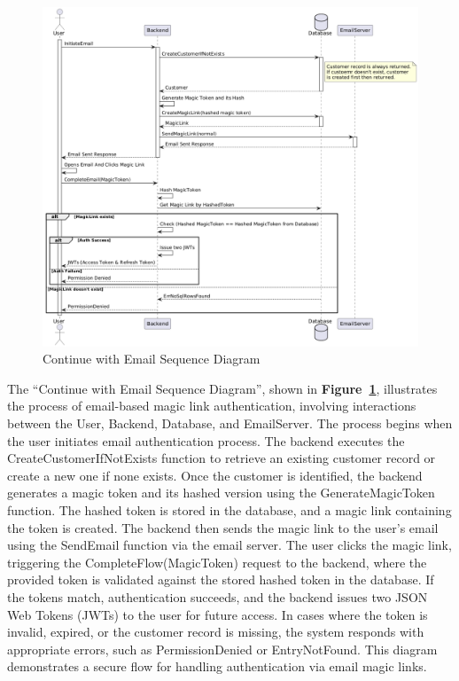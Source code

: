 \begin{figure}[!h]
  \centering
  \includegraphics[width=\textwidth]{images/docs/diagrams/sequence-diagrams/all-sequence-diagrams/Continue with Email.png}
  \caption{Continue with Email Sequence Diagram}
  \label{fig:seq/continue-with-email}
\end{figure}

The ``Continue with Email Sequence Diagram'', shown in \textbf{Figure~\ref{fig:seq/continue-with-email}}, illustrates the process of email-based magic link authentication, involving interactions between the User, Backend, Database, and EmailServer. The process begins when the user initiates email authentication process. The backend executes the CreateCustomerIfNotExists function to retrieve an existing customer record or create a new one if none exists. Once the customer is identified, the backend generates a magic token and its hashed version using the GenerateMagicToken function. The hashed token is stored in the database, and a magic link containing the token is created. The backend then sends the magic link to the user's email using the SendEmail function via the email server. The user clicks the magic link, triggering the CompleteFlow(MagicToken) request to the backend, where the provided token is validated against the stored hashed token in the database. If the tokens match, authentication succeeds, and the backend issues two JSON Web Tokens (JWTs) to the user for future access. In cases where the token is invalid, expired, or the customer record is missing, the system responds with appropriate errors, such as PermissionDenied or EntryNotFound. This diagram demonstrates a secure flow for handling authentication via email magic links.
